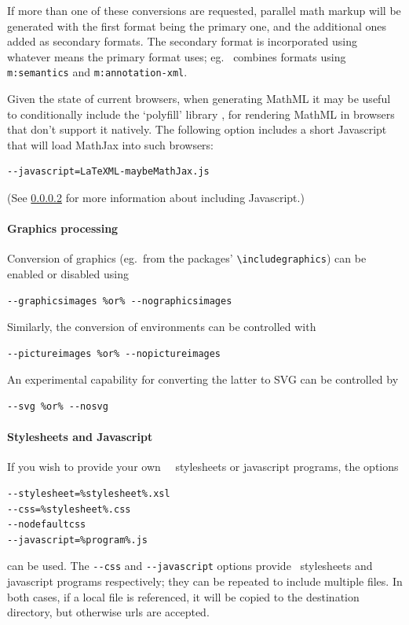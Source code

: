 \documentclass{book}
\newcommand{\shellcode}{\lstinline[style=shell]}
\begin{document}
If more than one of these conversions are requested,
parallel math markup will be generated with the first format
being the primary one, and the additional ones added as secondary formats.
The secondary format is incorporated using whatever means
the primary format uses; eg. \MathML\ combines formats using
\texttt{m:semantics} and \texttt{m:annotation-xml}.

Given the state of current browsers, when generating MathML it may be
useful to conditionally include the `polyfill' library ,
for rendering MathML in browsers that don't support it natively.
The following option includes a short Javascript that will load MathJax into such browsers:
\begin{lstlisting}[style=shell]
--javascript=LaTeXML-maybeMathJax.js
\end{lstlisting}
(See \ref{usage.post.xslt} for more information about including Javascript.)

\paragraph[Graphics]{Graphics processing}\label{usage.post.graphics}
Conversion of graphics (eg.~from the  packages' 
\verb|\includegraphics|) can be enabled or disabled
using
\begin{lstlisting}[style=shell]
--graphicsimages %or% --nographicsimages
\end{lstlisting}
Similarly, the conversion of  environments can be controlled with
\begin{lstlisting}[style=shell]
--pictureimages %or% --nopictureimages
\end{lstlisting}
An experimental capability for converting the latter to \textsc{SVG} can be
controlled by
\begin{lstlisting}[style=shell]
--svg %or% --nosvg
\end{lstlisting}

\paragraph{Stylesheets and Javascript}\label{usage.post.xslt}
If you wish to provide your own \XSLT\,
\CSS\ stylesheets or javascript programs, the options 
\begin{lstlisting}[style=shell]
--stylesheet=%stylesheet%.xsl
--css=%stylesheet%.css
--nodefaultcss
--javascript=%program%.js
\end{lstlisting}
can be used.  The \shellcode{--css} and  \shellcode{--javascript} options provide \CSS\ stylesheets
and javascript programs respectively; they can be repeated to include multiple files.
In both cases, if a local file is referenced, it will be copied to the
destination directory, but otherwise urls are accepted.
\end{document}
